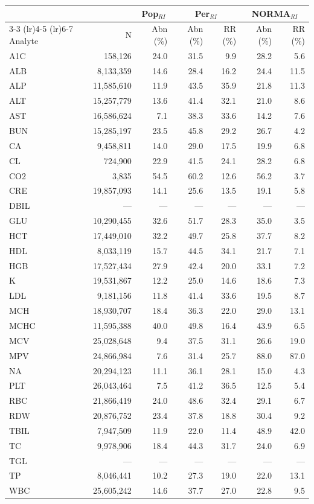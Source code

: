 \begin{table}[ht]
\centering
\footnotesize
\begin{tabular}{lrrrrrr}
\toprule
 & & \multicolumn{1}{c}{Pop$_{RI}$} & \multicolumn{2}{c}{Per$_{RI}$} & \multicolumn{2}{c}{NORMA$_{RI}$} \\
\cmidrule(lr){3-3} \cmidrule(lr){4-5} \cmidrule(lr){6-7}
Analyte & N & Abn (\%) & Abn (\%) & RR (\%) & Abn (\%) & RR (\%) \\
\midrule
A1C & 158,126 & 24.0 & 31.5 & 9.9 & 28.2 & 5.6 \\
ALB & 8,133,359 & 14.6 & 28.4 & 16.2 & 24.4 & 11.5 \\
ALP & 11,585,610 & 11.9 & 43.5 & 35.9 & 21.8 & 11.3 \\
ALT & 15,257,779 & 13.6 & 41.4 & 32.1 & 21.0 & 8.6 \\
AST & 16,586,624 & 7.1 & 38.3 & 33.6 & 14.2 & 7.6 \\
BUN & 15,285,197 & 23.5 & 45.8 & 29.2 & 26.7 & 4.2 \\
CA & 9,458,811 & 14.0 & 29.0 & 17.5 & 19.9 & 6.8 \\
CL & 724,900 & 22.9 & 41.5 & 24.1 & 28.2 & 6.8 \\
CO2 & 3,835 & 54.5 & 60.2 & 12.6 & 56.2 & 3.7 \\
CRE & 19,857,093 & 14.1 & 25.6 & 13.5 & 19.1 & 5.8 \\
DBIL & --- & --- & --- & --- & --- & --- \\
GLU & 10,290,455 & 32.6 & 51.7 & 28.3 & 35.0 & 3.5 \\
HCT & 17,449,010 & 32.2 & 49.7 & 25.8 & 37.7 & 8.2 \\
HDL & 8,033,119 & 15.7 & 44.5 & 34.1 & 21.7 & 7.1 \\
HGB & 17,527,434 & 27.9 & 42.4 & 20.0 & 33.1 & 7.2 \\
K & 19,531,867 & 12.2 & 25.0 & 14.6 & 18.6 & 7.3 \\
LDL & 9,181,156 & 11.8 & 41.4 & 33.6 & 19.5 & 8.7 \\
MCH & 18,930,707 & 18.4 & 36.3 & 22.0 & 29.0 & 13.1 \\
MCHC & 11,595,388 & 40.0 & 49.8 & 16.4 & 43.9 & 6.5 \\
MCV & 25,028,648 & 9.4 & 37.5 & 31.1 & 26.6 & 19.0 \\
MPV & 24,866,984 & 7.6 & 31.4 & 25.7 & 88.0 & 87.0 \\
NA & 20,294,123 & 11.1 & 36.1 & 28.1 & 15.0 & 4.3 \\
PLT & 26,043,464 & 7.5 & 41.2 & 36.5 & 12.5 & 5.4 \\
RBC & 21,866,419 & 24.0 & 48.6 & 32.4 & 29.1 & 6.7 \\
RDW & 20,876,752 & 23.4 & 37.8 & 18.8 & 30.4 & 9.2 \\
TBIL & 7,947,509 & 11.9 & 22.0 & 11.4 & 48.9 & 42.0 \\
TC & 9,978,906 & 18.4 & 44.3 & 31.7 & 24.0 & 6.9 \\
TGL & --- & --- & --- & --- & --- & --- \\
TP & 8,046,441 & 10.2 & 27.3 & 19.0 & 22.0 & 13.1 \\
WBC & 25,605,242 & 14.6 & 37.7 & 27.0 & 22.8 & 9.5 \\
\bottomrule
\end{tabular}
\label{tab:chs_prevalence}
\end{table}